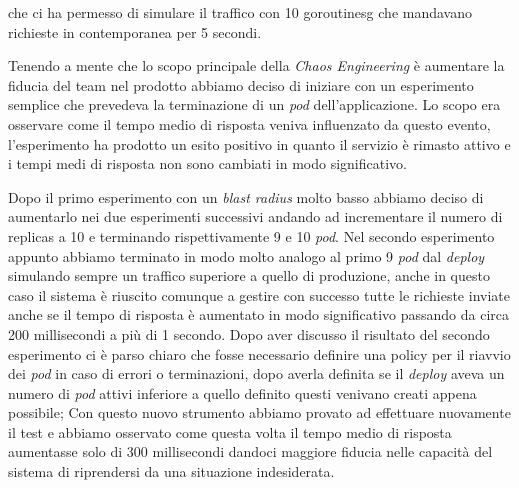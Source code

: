 che ci ha permesso di simulare il traffico con 10 \gls{goroutinesg} che mandavano richieste in contemporanea per 5 secondi.

Tenendo a mente che lo scopo principale della \textit{Chaos Engineering} è aumentare la fiducia del team nel prodotto abbiamo deciso di iniziare con un esperimento semplice che prevedeva la terminazione di un \textit{pod} dell'applicazione.
Lo scopo era osservare come il tempo medio di risposta veniva influenzato da questo evento, l'esperimento ha prodotto un esito positivo in quanto il servizio è rimasto attivo e i tempi medi di risposta non sono cambiati in modo significativo.


Dopo il primo esperimento con un \textit{blast radius} molto basso abbiamo deciso di aumentarlo nei due esperimenti successivi andando ad incrementare il numero di replicas a 10 e terminando rispettivamente 9 e 10 \textit{pod}.
Nel secondo esperimento appunto abbiamo terminato in modo molto analogo al primo 9 \textit{pod} dal \textit{deploy} simulando sempre un traffico superiore a quello di produzione, anche in questo caso il sistema è riuscito comunque a gestire con successo tutte le richieste inviate anche se il tempo di risposta è aumentato in modo significativo passando da circa 200 millisecondi a più di 1 secondo.
Dopo aver discusso il risultato del secondo esperimento ci è parso chiaro che fosse necessario definire una policy per il riavvio dei \textit{pod} in caso di errori o terminazioni, dopo averla definita se il \textit{deploy} aveva un numero di \textit{pod} attivi inferiore a quello definito questi venivano creati appena possibile; Con questo nuovo strumento abbiamo provato ad effettuare nuovamente il test e abbiamo osservato come questa volta il tempo medio di risposta aumentasse solo di 300 millisecondi dandoci maggiore fiducia nelle capacità del sistema di riprendersi da una situazione indesiderata.


